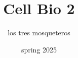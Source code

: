 \documentclass[10pt,a4paper]{article}
\begin{document}
	
	\begin{titlepage}
		\title{Cell Bio 2}
		\author{los tres mosqueteros}
		\date{spring 2025}
		\maketitle
	\end{titlepage}
	
	\setcounter{page}{1} 
	
	\newpage
	
	\tableofcontents
	
	\newpage
	
	\setcounter{page}{1} 
	
	

        \printglossaries
	\newpage
\end{document}
